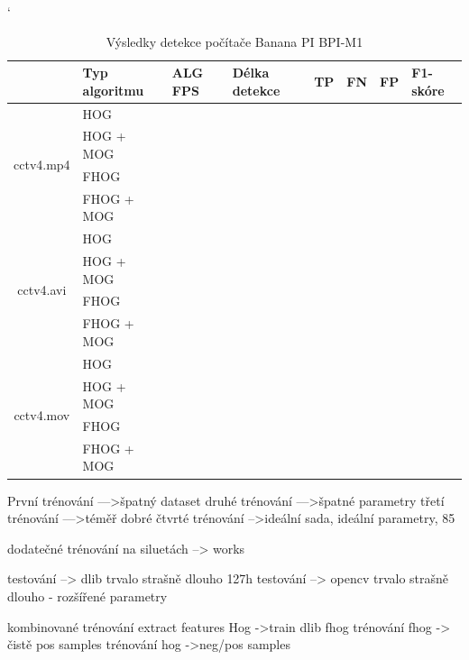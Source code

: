 \begin{table}[H]
\catcode`
\centering
\caption{Výsledky detekce počítače Banana PI BPI-M1}
\label{resultTabBPI}
\begin{tabular}{|c|l|l|l|l|l|l|l|}
\hline
                         & Typ algoritmu   & ALG FPS & Délka detekce & TP & FN & FP & F1-skóre \\ \hline
\multirow{4}{*}{cctv4.mp4} & HOG        &         &               &    &    &    &          \\ \cline{2-8} 
                         & HOG + MOG  &         &               &    &    &    &          \\ \cline{2-8} 
                         & FHOG       &         &               &    &    &    &          \\ \cline{2-8} 
                         & FHOG + MOG &         &               &    &    &    &          \\ \hline\hline 
\multirow{4}{*}{cctv4.avi} & HOG        &         &               &    &    &    &          \\ \cline{2-8} 
                         & HOG + MOG  &         &               &    &    &    &          \\ \cline{2-8} 
                         & FHOG       &         &               &    &    &    &          \\ \cline{2-8} 
                         & FHOG + MOG &         &               &    &    &    &          \\ \hline \hline
\multirow{4}{*}{cctv4.mov} & HOG        &         &               &    &    &    &          \\ \cline{2-8} 
                         & HOG + MOG  &         &               &    &    &    &          \\ \cline{2-8} 
                         & FHOG       &         &               &    &    &    &          \\ \cline{2-8} 
                         & FHOG + MOG &         &               &    &    &    &          \\ \hline
\end{tabular}
\end{table}
 První trénování --->špatný dataset
 druhé trénování --->špatné parametry
 třetí trénování --->téměř dobré
 čtvrté trénování -->ideální sada, ideální parametry, 85%
 
 dodatečné trénování na siluetách --> works


 testování --> dlib trvalo strašně dlouho 127h
 testování --> opencv trvalo strašně dlouho - rozšířené parametry


 kombinované trénování  extract features Hog  ->train dlib fhog
 trénování fhog -> čistě pos samples
 trénování hog ->neg/pos samples

